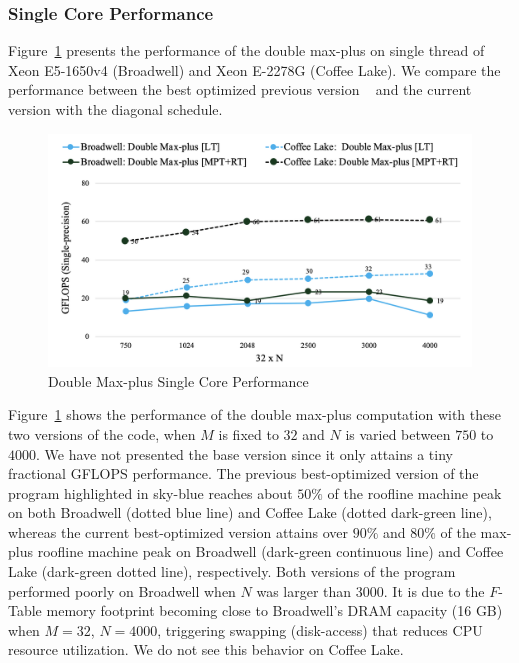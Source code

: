 \subsubsection{Single Core Performance}
Figure~\ref{fig:st_performance_analysis_double_max_plus} presents the performance of the double max-plus on single thread of Xeon E5-1650v4 (Broadwell) and Xeon E-2278G (Coffee Lake). We compare the performance between the best optimized previous version ~\cite{Mondal2021} and the current version with the diagonal schedule.
\begin{figure}[htbp]
\centerline{\includegraphics[scale=0.38, trim=5 5 5 5,clip]{content/figures/dpm_single_core_new.png}}
\caption{Double Max-plus Single Core Performance}
\label{fig:st_performance_analysis_double_max_plus}
\end{figure}
Figure~\ref{fig:st_performance_analysis_double_max_plus} shows the performance of the double max-plus computation with these two versions of the code, when $M$ is fixed to $32$ and $N$ is varied between $750$ to $4000$. We have not presented the base version since it only attains a tiny fractional GFLOPS performance. The previous best-optimized version of the program highlighted in sky-blue reaches about $50\%$ of the roofline machine peak on both Broadwell (dotted blue line) and Coffee Lake (dotted dark-green line), whereas the current best-optimized version attains over $90\%$ and $80\%$ of the max-plus roofline machine peak on Broadwell (dark-green continuous line) and Coffee Lake (dark-green dotted line), respectively. Both versions of the program performed poorly on Broadwell when $N$ was larger than $3000$. It is due to the $F$-Table memory footprint becoming close to Broadwell's DRAM capacity (16 GB) when $M=32$, $N=4000$, triggering swapping (disk-access) that reduces CPU resource utilization. We do not see this behavior on Coffee Lake.


